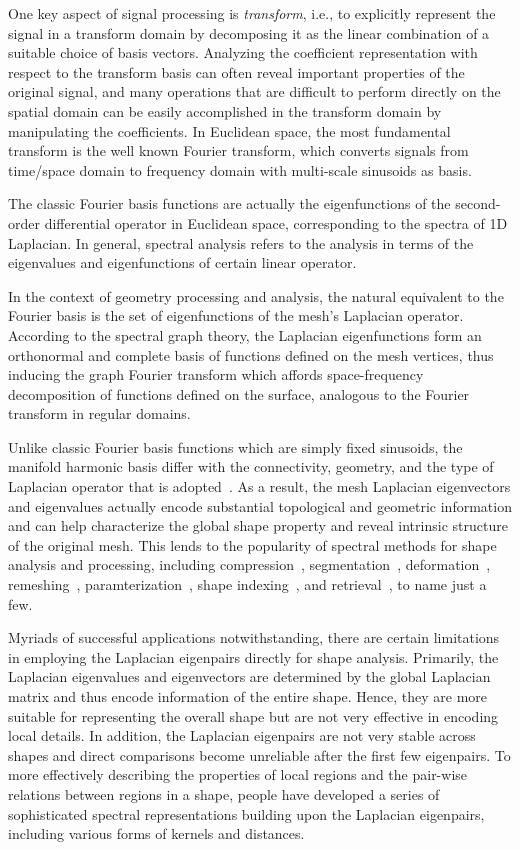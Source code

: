 One key aspect of signal processing is \emph{transform}, i.e., to explicitly represent 
the signal in a transform domain by decomposing it as the linear combination of a suitable
choice of basis vectors. Analyzing the coefficient representation with respect to the transform
basis can often reveal important properties of the original signal, and many
operations that are difficult to perform directly on the spatial domain
can be easily accomplished in the transform domain by manipulating the
coefficients. In Euclidean space, the most fundamental transform
is the well known Fourier transform, which converts signals from time/space domain to
frequency domain with multi-scale sinusoids as basis. 

The classic Fourier basis functions are actually the eigenfunctions of the second-order 
differential operator in Euclidean space, corresponding to the spectra of 1D Laplacian.
In general, spectral analysis refers to the analysis in terms of the
eigenvalues and eigenfunctions of certain linear operator. 

In the context of geometry processing and analysis, the natural equivalent to the 
Fourier basis is the set of eigenfunctions of the mesh's Laplacian operator.
According to the spectral graph theory, the Laplacian eigenfunctions form an 
orthonormal and complete basis of functions defined on the mesh vertices, thus inducing the
graph Fourier transform which affords space-frequency decomposition of functions defined on 
the surface, analogous to the Fourier transform in regular domains. 

Unlike classic Fourier basis functions which are simply fixed sinusoids, the manifold harmonic 
basis differ with the connectivity, geometry, and the type of Laplacian operator that is 
adopted~\cite{Zhang:2010:CGF}. As a result, the mesh Laplacian eigenvectors and eigenvalues 
actually encode substantial topological and geometric information and can help characterize 
the global shape property and reveal intrinsic structure of the original mesh. This lends 
to the popularity of spectral methods for shape analysis and processing, including 
compression~\cite{Karni2000}, segmentation~\cite{Liu2007}, deformation~\cite{Rong2008}, 
remeshing~\cite{dong2006spectral}, paramterization~\cite{Zhou2004}, shape indexing~\cite{Reuter:2006:CAD},
and retrieval~\cite{Lavoue:2012}, to name just a few.

Myriads of successful applications notwithstanding, there are certain 
limitations in employing the Laplacian eigenpairs directly for shape analysis. 
Primarily, the Laplacian eigenvalues and eigenvectors are determined by the 
global Laplacian matrix and thus encode information of the entire shape. 
Hence, they are more suitable for representing the overall shape but are not 
very effective in encoding local details. In addition, the Laplacian eigenpairs 
are not very stable across shapes and direct comparisons become unreliable 
after the first few eigenpairs. To more effectively describing the properties 
of local regions and the pair-wise relations between regions in a shape, people
have developed a series of sophisticated spectral representations building upon 
the Laplacian eigenpairs, including various forms of kernels and distances.


